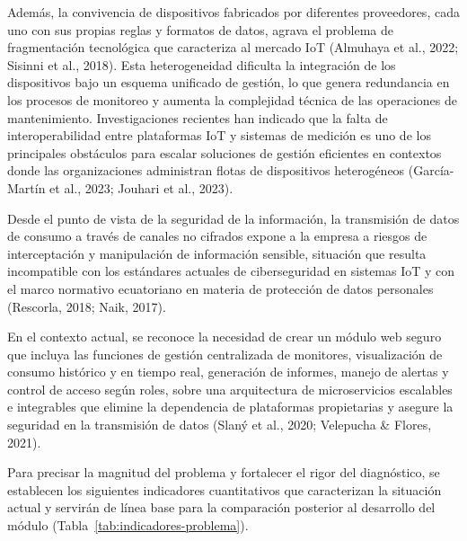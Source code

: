 \documentclass[12pt,a4paper,oneside]{report}
\begin{document}
Además, la convivencia de dispositivos fabricados por diferentes proveedores, cada uno con sus propias reglas y formatos de datos, agrava el problema de fragmentación tecnológica que caracteriza al mercado IoT (Almuhaya et al., 2022; Sisinni et al., 2018). Esta heterogeneidad dificulta la integración de los dispositivos bajo un esquema unificado de gestión, lo que genera redundancia en los procesos de monitoreo y aumenta la complejidad técnica de las operaciones de mantenimiento. Investigaciones recientes han indicado que la falta de interoperabilidad entre plataformas IoT y sistemas de medición es uno de los principales obstáculos para escalar soluciones de gestión eficientes en contextos donde las organizaciones administran flotas de dispositivos heterogéneos (García-Martín et al., 2023; Jouhari et al., 2023).

Desde el punto de vista de la seguridad de la información, la transmisión de datos de consumo a través de canales no cifrados expone a la empresa a riesgos de interceptación y manipulación de información sensible, situación que resulta incompatible con los estándares actuales de ciberseguridad en sistemas IoT y con el marco normativo ecuatoriano en materia de protección de datos personales (Rescorla, 2018; Naik, 2017).

En el contexto actual, se reconoce la necesidad de crear un módulo web seguro que incluya las funciones de gestión centralizada de monitores, visualización de consumo histórico y en tiempo real, generación de informes, manejo de alertas y control de acceso según roles, sobre una arquitectura de microservicios escalables e integrables que elimine la dependencia de plataformas propietarias y asegure la seguridad en la transmisión de datos (Slaný et al., 2020; Velepucha \& Flores, 2021).

Para precisar la magnitud del problema y fortalecer el rigor del diagnóstico, se establecen los siguientes indicadores cuantitativos que caracterizan la situación actual y servirán de línea base para la comparación posterior al desarrollo del módulo (Tabla~\ref{tab:indicadores-problema}).
\end{document}
